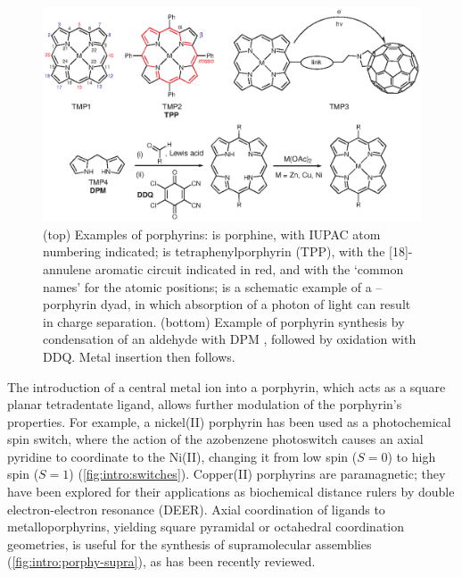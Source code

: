 	\begin{figure}[ht!]
		\centering\includegraphics{figures/intro/porphyrin-numbering.eps} 
		\caption[]{(top) Examples of porphyrins:  is porphine, with IUPAC atom numbering indicated;  is tetraphenylporphyrin (TPP), with the [18]-annulene aromatic circuit indicated in red, and with the `common names' for the atomic positions;  is a schematic example of a --porphyrin dyad, in which absorption of a photon of light can result in charge separation. (bottom) Example of porphyrin synthesis by condensation of an aldehyde with DPM , followed by oxidation with DDQ\@. Metal insertion then follows.}
		\label{fig:intro:porphs}
	\end{figure}


	The introduction of a central metal ion into a porphyrin, which acts as a square planar tetradentate ligand, allows further modulation of the porphyrin's properties. For example, a nickel(II) porphyrin  has been used as a photochemical spin switch, where the action of the azobenzene photoswitch causes an axial pyridine to coordinate to the Ni(II), changing it from low spin ($S=0$) to high spin ($S=1$) (\autoref{fig:intro:switches}).\autocite{Venkataramani2011} Copper(II) porphyrins are paramagnetic; they have been explored for their applications as biochemical distance rulers by double electron-electron resonance (DEER).\autocite{Bowen2016} Axial coordination of ligands to metalloporphyrins, yielding square pyramidal or octahedral coordination geometries, is useful for the synthesis of supramolecular assemblies (\autoref{fig:intro:porphy-supra}), as has been recently reviewed.\autocite{Wang2016}

